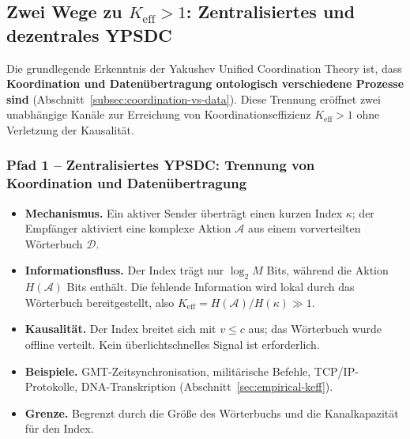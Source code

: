 \documentclass[11pt,a4paper]{article}
\begin{document}
	\subsection{Zwei Wege zu \(K_{\mathrm{eff}} > 1\): Zentralisiertes und dezentrales YPSDC}
	\label{subsec:two-paths}
	
	Die grundlegende Erkenntnis der Yakushev Unified Coordination Theory ist, dass
	\textbf{Koordination und Datenübertragung ontologisch verschiedene Prozesse sind}
	(Abschnitt~\ref{subsec:coordination-vs-data}). Diese Trennung eröffnet zwei
	unabhängige Kanäle zur Erreichung von Koordinationseffizienz
	\(K_{\mathrm{eff}} > 1\) ohne Verletzung der Kausalität.
	
	\subsubsection*{Pfad 1 – Zentralisiertes YPSDC: Trennung von Koordination und Datenübertragung}
	\begin{itemize}[leftmargin=*]
		\item \textbf{Mechanismus.} Ein aktiver Sender überträgt einen kurzen Index \(\kappa\);
		der Empfänger aktiviert eine komplexe Aktion \(\mathcal{A}\) aus einem vorverteilten
		Wörterbuch \(\mathcal{D}\).
		\item \textbf{Informationsfluss.} Der Index trägt nur \(\log_2 M\) Bits,
		während die Aktion \(H(\mathcal{A})\) Bits enthält. Die fehlende Information
		wird lokal durch das Wörterbuch bereitgestellt, also
		\(K_{\mathrm{eff}} = H(\mathcal{A}) / H(\kappa) \gg 1\).
		\item \textbf{Kausalität.} Der Index breitet sich mit \(v \le c\) aus; das Wörterbuch
		wurde offline verteilt. Kein überlichtschnelles Signal ist erforderlich.
		\item \textbf{Beispiele.} GMT-Zeitsynchronisation, militärische Befehle,
		TCP/IP-Protokolle, DNA-Transkription (Abschnitt~\ref{sec:empirical-keff}).
		\item \textbf{Grenze.} Begrenzt durch die Größe des Wörterbuchs und die
		Kanalkapazität für den Index.
	\end{itemize}
	
\end{document}
